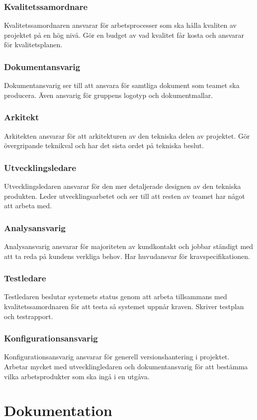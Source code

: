 \subsubsection*{Kvalitetssamordnare}
Kvalitetssamordnaren ansvarar för arbetsprocesser som ska hålla kvaliten av projektet på en hög nivå. Gör en budget av vad kvalitet får kosta och ansvarar för kvalitetsplanen.

\subsubsection*{Dokumentansvarig}
Dokumentansvarig ser till att ansvara för samtliga dokument som teamet ska producera. Även ansvarig för gruppens logotyp och dokumentmallar.

\subsubsection*{Arkitekt}
Arkitekten ansvarar för att arkitekturen av den tekniska delen av projektet. Gör övergripande teknikval och har det sista ordet på tekniska beslut.

\subsubsection*{Utvecklingsledare}
Utvecklingsledaren ansvarar för den mer detaljerade designen av den tekniska produkten. Leder utvecklingsarbetet och ser till att resten av teamet har något att arbeta med.

\subsubsection*{Analysansvarig}
Analysansvarig ansvarar för majoriteten av kundkontakt och jobbar ständigt med att ta reda på kundens verkliga behov. Har huvudansvar för kravspecifikationen.

\subsubsection*{Testledare}
Testledaren beslutar systemets status genom att arbeta tillsammans med kvalitetssamordnaren för att testa så systemet uppnår kraven. Skriver testplan och testrapport.

\subsubsection*{Konfigurationsansvarig}
Konfigurationsansvarig ansvarar för generell versionshantering i projektet. Arbetar mycket med utvecklingledaren och dokumentansvarig för att bestämma vilka arbetsprodukter som ska ingå i en utgåva.


\section{Dokumentation}

\section{}



